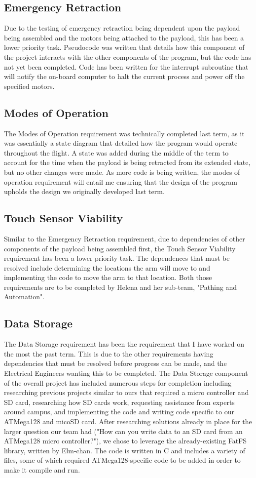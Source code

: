 \documentclass[letterpaper,10pt]{article}
\begin{document}
\subsection{Emergency Retraction}
Due to the testing of emergency retraction being dependent upon the payload being assembled and the 
motors being attached to the payload, this has been a lower priority task. Pseudocode was written that 
details how this component of the project interacts with the other components of the program, but the 
code has not yet been completed. Code has been written for the interrupt subroutine that will notify the 
on-board computer to halt the current process and power off the specified motors.
\subsection{Modes of Operation}
The Modes of Operation requirement was technically completed last term, as it was essentially a state 
diagram that detailed how the program would operate throughout the flight. A state was added during the 
middle of the term to account for the time when the payload is being retracted from its extended state, 
but no other changes were made. As more code is being written, the modes of operation requirement will 
entail me ensuring that the design of the program upholds the design we originally developed last term.
\subsection{Touch Sensor Viability}
Similar to the Emergency Retraction requirement, due to dependencies of other components of the 
payload being assembled first, the Touch Sensor Viability requirement has been a lower-priority task. 
The dependences that must be resolved include determining the locations the arm will move to and 
implementing the code to move the arm to that location. Both those requirements are to be completed by 
Helena and her sub-team, "Pathing and Automation".
\subsection{Data Storage}
The Data Storage requirement has been the requirement that I have worked on the most the past term.
This is due to the other requirements having dependencies that must be resolved before progress
can be made, and the Electrical Engineers wanting this to be completed. The Data Storage component of the overall project has included numerous steps for completion including researching previous projects
similar to ours that required a micro controller and SD card, researching how SD cards work, requesting
assistance from experts around campus, and implementing the code and writing code specific to our ATMega128 and micoSD card. After researching solutions already in place for the larger question our team had ("How can you write data to an SD card from an ATMega128 micro controller?"), we chose to 
leverage the already-existing FatFS library, written by Elm-chan. The code is written in C and includes
a variety of files, some of which required ATMega128-specific code to be added in order to make it
compile and run. 
\end{document}
